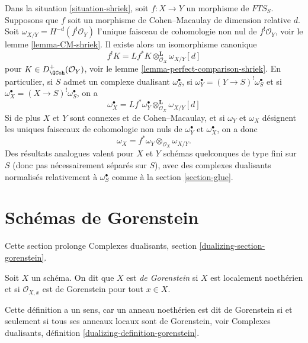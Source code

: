 \begin{remark}
\label{remark-CM-morphism-compare-dualizing}
Dans la situation \ref{situation-shriek}, soit $f : X \to Y$ un morphisme de $\textit{FTS}_S$. Supposons que $f$ soit un morphisme de Cohen–Macaulay de dimension relative $d$. Soit $\omega_{X/Y} = H^{-d}(f^!\mathcal{O}_Y)$ l'unique faisceau de cohomologie non nul de $f^!\mathcal{O}_Y$, voir le lemme \ref{lemma-CM-shriek}. Il existe alors un isomorphisme canonique
$$
f^!K = Lf^*K \otimes_{\mathcal{O}_X}^\mathbf{L} \omega_{X/Y}[d]
$$
pour $K \in D^+_\QCoh(\mathcal{O}_Y)$, voir le lemme \ref{lemma-perfect-comparison-shriek}. En particulier, si $S$ admet un complexe dualisant $\omega_S^\bullet$, si $\omega_Y^\bullet = (Y \to S)^!\omega_S^\bullet$ et si $\omega_X^\bullet = (X \to S)^!\omega_S^\bullet$, on a
$$
\omega_X^\bullet =
Lf^*\omega_Y^\bullet \otimes_{\mathcal{O}_X}^\mathbf{L} \omega_{X/Y}[d]
$$
Si de plus $X$ et $Y$ sont connexes et de Cohen–Macaulay, et si $\omega_Y$ et $\omega_X$ désignent les uniques faisceaux de cohomologie non nuls de $\omega_Y^\bullet$ et $\omega_X^\bullet$, on a donc
$$
\omega_X = f^*\omega_Y \otimes_{\mathcal{O}_X} \omega_{X/Y}.
$$
Des résultats analogues valent pour $X$ et $Y$ schémas quelconques de type fini sur $S$ (donc pas nécessairement séparés sur $S$), avec des complexes dualisants normalisés relativement à $\omega_S^\bullet$ comme à la section \ref{section-glue}.
\end{remark}





\section{Schémas de Gorenstein}
\label{section-gorenstein}

\noindent
Cette section prolonge Complexes dualisants, section \ref{dualizing-section-gorenstein}.

\begin{definition}
\label{definition-gorenstein}
Soit $X$ un schéma. On dit que $X$ est {\it de Gorenstein} si $X$ est localement noethérien et si $\mathcal{O}_{X, x}$ est de Gorenstein pour tout $x \in X$.
\end{definition}

\noindent
Cette définition a un sens, car un anneau noethérien est dit de Gorenstein si et seulement si tous ses anneaux locaux sont de Gorenstein, voir Complexes dualisants, définition \ref{dualizing-definition-gorenstein}.

